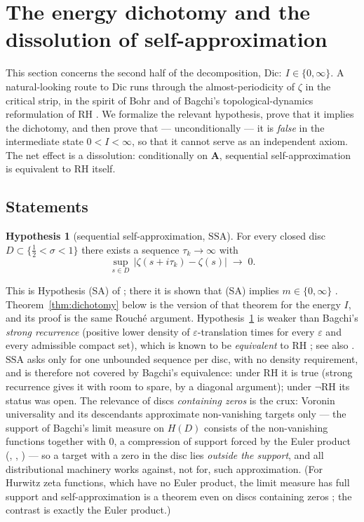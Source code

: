 \documentclass[11pt]{amsart}
\theoremstyle{plain}
\theoremstyle{definition}
\newtheorem{hypothesis}[theorem]{Hypothesis}
\theoremstyle{remark}
\newcommand{\RH}{\mathrm{RH}}
\newcommand{\Dic}{\mathrm{Dic}}
\newcommand{\Aax}{\mathbf{A}}
\begin{document}
\section{The energy dichotomy and the dissolution of self-approximation}\label{sec:dichotomy}

This section concerns the second half of the decomposition, $\Dic:\ I\in\{0,\infty\}$. A natural-looking route to $\Dic$ runs through the almost-periodicity of $\zeta$ in the critical strip, in the spirit of Bohr and of Bagchi's topological-dynamics reformulation of $\RH$ \cite{Bagchi1981,Bagchi1987}. We formalize the relevant hypothesis, prove that it implies the dichotomy, and then prove that --- unconditionally --- it is \emph{false} in the intermediate state $0<I<\infty$, so that it cannot serve as an independent axiom. The net effect is a dissolution: conditionally on $\Aax$, sequential self-approximation is equivalent to $\RH$ itself.

\subsection{Statements}

\begin{hypothesis}[sequential self-approximation, $\mathrm{SSA}$]\label{hyp:ssa}
For every closed disc $D\subset\{\tfrac12<\sigma<1\}$ there exists a sequence $\tau_k\to\infty$ with
\[
\sup_{s\in D}\,\bigl|\zeta(s+i\tau_k)-\zeta(s)\bigr|\;\longrightarrow\;0 .
\]
\end{hypothesis}

This is Hypothesis (SA) of \cite[Def.~2.1]{P30}; there it is shown that (SA) implies $m\in\{0,\infty\}$ \cite[Thm.~2.3]{P30}. Theorem~\ref{thm:dichotomy} below is the version of that theorem for the energy $I$, and its proof is the same Rouch\'e argument. Hypothesis~\ref{hyp:ssa} is weaker than Bagchi's \emph{strong recurrence} (positive lower density of $\varepsilon$-translation times for every $\varepsilon$ and every admissible compact set), which is known to be \emph{equivalent} to $\RH$ \cite{Bagchi1981,Bagchi1987}; see also \cite[Ch.~8]{Steuding2007}. $\mathrm{SSA}$ asks only for one unbounded sequence per disc, with no density requirement, and is therefore not covered by Bagchi's equivalence: under $\RH$ it is true (strong recurrence gives it with room to spare, by a diagonal argument); under $\neg\RH$ its status was open. The relevance of discs \emph{containing zeros} is the crux: Voronin universality \cite{Voronin1975} and its descendants approximate non-vanishing targets only --- the support of Bagchi's limit measure on $H(D)$ consists of the non-vanishing functions together with $0$, a compression of support forced by the Euler product (\cite{Bagchi1981}, \cite[Ch.~6]{Laurincikas1996}, \cite{Steuding2007}) --- so a target with a zero in the disc lies \emph{outside the support}, and all distributional machinery works against, not for, such approximation. (For Hurwitz zeta functions, which have no Euler product, the limit measure has full support and self-approximation is a theorem even on discs containing zeros \cite{GarunkstisKarikovas2014}; the contrast is exactly the Euler product.)
\end{document}
